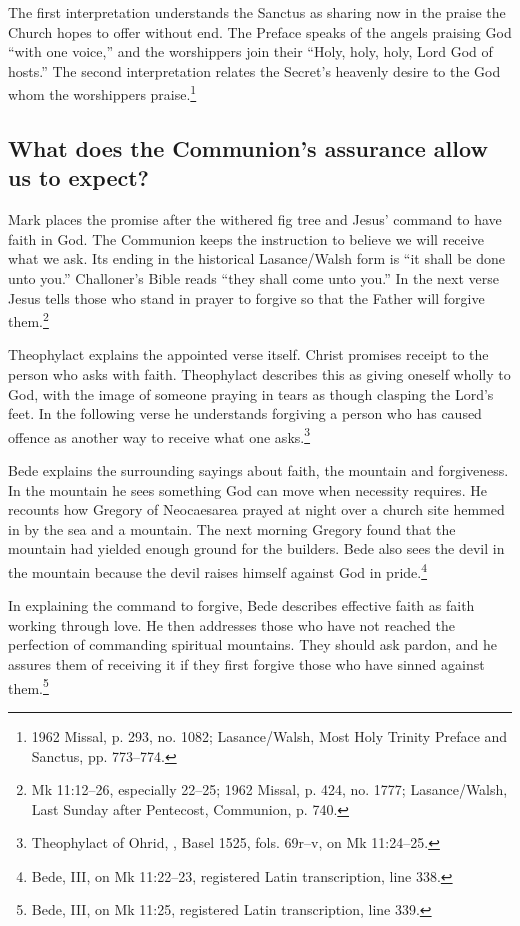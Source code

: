 The first interpretation understands the Sanctus as sharing now in
the praise the Church hopes to offer without end. The Preface speaks
of the angels praising God ``with one voice,'' and the worshippers
join their ``Holy, holy, holy, Lord God of hosts.'' The second
interpretation relates the Secret's heavenly desire to the God whom the worshippers
praise.\footnote{1962 Missal, p. 293, no. 1082; Lasance/Walsh,
Most Holy Trinity Preface and Sanctus, pp. 773--774.}

\subsection{What does the Communion's assurance allow us to expect?}

Mark places the promise after the withered fig tree and Jesus' command
to have faith in God. The Communion keeps the instruction to believe
we will receive what we ask. Its ending in the historical Lasance/Walsh
form is ``it shall be done unto you.'' Challoner's Bible reads
``they shall come unto you.'' In the next verse Jesus tells those who
stand in prayer to forgive so that the Father will forgive them.\footnote{Mk 11:12--26, especially 22--25;
1962 Missal, p. 424, no. 1777; Lasance/Walsh, Last Sunday after
Pentecost, Communion, p. 740.}

Theophylact explains the appointed verse itself. Christ promises
receipt to the person who asks with faith. Theophylact describes this
as giving oneself wholly to God, with the image of someone praying
in tears as though clasping the Lord's feet. In the following verse
he understands forgiving a person who has caused offence as another
way to receive what one asks.\footnote{Theophylact of Ohrid,
, Basel 1525, fols. 69r--v, on Mk 11:24--25.}

Bede explains the surrounding sayings about faith, the mountain
and forgiveness. In the mountain he sees something God can move when
necessity requires. He recounts how Gregory of Neocaesarea prayed at
night over a church site hemmed in by the sea and a mountain. The
next morning Gregory found that the mountain had yielded enough ground
for the builders. Bede also sees the devil in the mountain because the
devil raises himself against God in pride.\footnote{Bede,  III, on Mk 11:22--23, registered Latin transcription, line 338.}

In explaining the command to forgive, Bede describes effective faith
as faith working through love. He then addresses those who have
not reached the perfection of commanding spiritual mountains.
They should ask pardon, and he assures them of receiving it if
they first forgive those who have sinned against them.\footnote{Bede,
 III, on Mk 11:25, registered
Latin transcription, line 339.}

